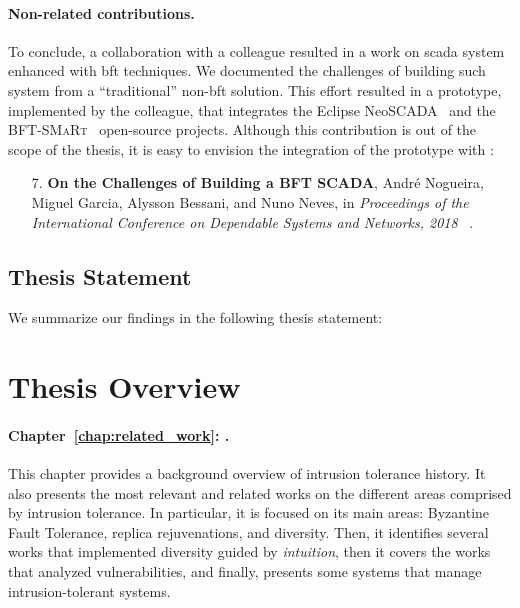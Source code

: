 \paragraph{Non-related contributions.}
To conclude, a collaboration with a colleague resulted in a work on \gls{scada} system enhanced with \gls{bft} techniques. 
We documented the challenges of building such system from a ``traditional'' non-\gls{bft} solution.
This effort resulted in a prototype, implemented by the colleague, that integrates the Eclipse NeoSCADA~\cite{eclipsescada} and the \textsc{BFT-SMaRt}~\cite{Bessani:2014} open-source projects.
Although this contribution is out of the scope of the thesis, it is easy to envision the integration of the prototype with \system:


\begin{enumerate}

\item[7.] \textbf{On the Challenges of Building a BFT SCADA}, Andr\'{e} Nogueira, Miguel Garcia, Alysson Bessani, and Nuno Neves, in \emph{Proceedings of the International Conference on Dependable Systems and Networks, 2018 }~\cite{Nogueira:2018}.
\end{enumerate}


\subsection{Thesis Statement}
We summarize our findings in the following thesis statement:

\vspace{2mm}

\section{Thesis Overview}
\paragraph{Chapter~\ref{chap:related_work}: .}
This chapter provides a background overview of intrusion tolerance history. 
It also presents the most relevant and related works on the different areas comprised by intrusion tolerance.
In particular, it is focused on its main areas: Byzantine Fault Tolerance, replica rejuvenations, and diversity.
Then, it identifies several works that implemented diversity guided by \emph{intuition}, then it covers the works that analyzed vulnerabilities, and finally, presents some systems that manage intrusion-tolerant systems.


